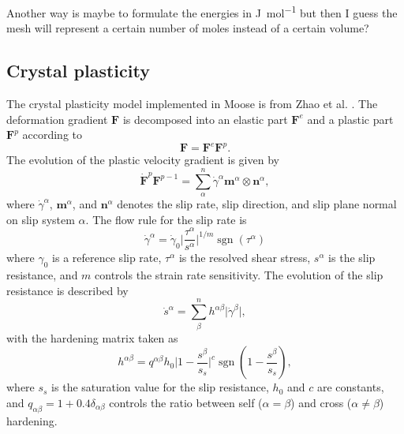 \documentclass[12pt,a4paper]{article}
\providecommand{\abs}[1]{\lvert#1\rvert}
\providecommand{\vbf}[1]{\boldsymbol{#1}}
\DeclareMathOperator{\sgn}{sgn}
\begin{document}
Another way is maybe to formulate the energies in \si{\joule\per\mol} but then I guess the mesh will represent a certain number of moles instead of a certain volume? 

\subsection{Crystal plasticity}\label{sec:crypla}
The crystal plasticity model implemented in Moose is from Zhao et al. \cite{zhao2017plastic}.
The deformation gradient $\vbf{F}$ is decomposed into an elastic part $\vbf{F}^e$ and a plastic part $\vbf{F}^p$ according to
\begin{equation}
\vbf{F}=\vbf{F}^e\vbf{F}^p.
\end{equation}
The evolution of the plastic velocity gradient is given by
\begin{equation}
  \dot{\vbf{F}}^p\vbf{F}^{p-1}=\sum_\alpha^n\dot{\gamma}^\alpha\vbf{m}^\alpha\otimes\vbf{n}^\alpha,
\end{equation}
where $\dot{\gamma}^\alpha$, $\vbf{m}^\alpha$, and $\vbf{n}^\alpha$ denotes the slip rate, slip direction, and slip plane normal on slip system $\alpha$.
The flow rule for the slip rate is 
\begin{equation}
  \dot{\gamma}^\alpha=\dot{\gamma}_0\abs{\frac{\tau^\alpha}{s^\alpha}}^{1/m}\sgn{(\tau^\alpha)}
\end{equation}
where $\gamma_0$ is a reference slip rate, $\tau^\alpha$ is the resolved shear stress, $s^\alpha$ is the slip resistance, and $m$ controls the strain rate sensitivity.
The evolution of the slip resistance is described by
\begin{equation}
  \dot{s}^\alpha=\sum_\beta^nh^{\alpha\beta}\abs{\dot{\gamma}^\beta},
\end{equation}
with the hardening matrix taken as
\begin{equation}
  h^{\alpha\beta}=q^{\alpha\beta}h_0\abs{1-\frac{s^\beta}{s_s}}^c\sgn(1-\frac{s^\beta}{s_s}),
\end{equation}
where $s_s$ is the saturation value for the slip resistance, $h_0$ and $c$ are constants, and $q_{\alpha\beta}=1+0.4\delta_{\alpha\beta}$ controls the ratio between self ($\alpha=\beta$) and cross ($\alpha\neq\beta$) hardening.
\end{document}
